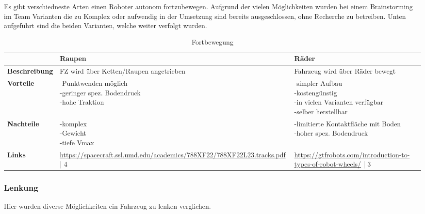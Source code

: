 Es gibt verschiedneste Arten einen Roboter autonom fortzubewegen. Aufgrund der vielen Möglichkeiten wurden bei einem Brainstorming im Team Varianten die zu Komplex oder aufwendig in der Umsetzung sind bereits ausgeschlossen, ohne Recherche zu betreiben. Unten aufgeführt sind die beiden Varianten, welche weiter verfolgt wurden.

\begin{table}[H]
\centering
\small
\begin{tabularx}{\textwidth}{|l|X|X|}
\hline
\textbf{} & \textbf{Raupen} & \textbf{Räder} \\
  \hline
  \textbf{Beschreibung}  & FZ wird über Ketten/Raupen angetrieben & Fahrzeug wird über Räder bewegt \\
  \hline
  \textbf{Vorteile}  & \makecell{-Punktwenden möglich\\-geringer spez. Bodendruck\\-hohe Traktion} & \makecell{-simpler Aufbau\\-kostengünstig\\-in vielen Varianten verfügbar\\-selber herstellbar}  \\
  \hline
  \textbf{Nachteile} & \makecell{-komplex\\-Gewicht\\-tiefe Vmax} & \makecell{-limitierte Kontaktfläche mit Boden\\-hoher spez. Bodendruck} \\
  \hline
  \textbf{Links} & \url{https://spacecraft.ssl.umd.edu/academics/788XF22/788XF22L23.tracks.pdf} | 4 & \url{https://gtfrobots.com/introduction-to-types-of-robot-wheels/} | 3\\
  \hline
\end{tabularx}
\caption{Fortbewegung}
\label{table:drive}
\end{table}



\subsubsection{Lenkung}

Hier wurden diverse Möglichkeiten ein Fahrzeug zu lenken verglichen. 

